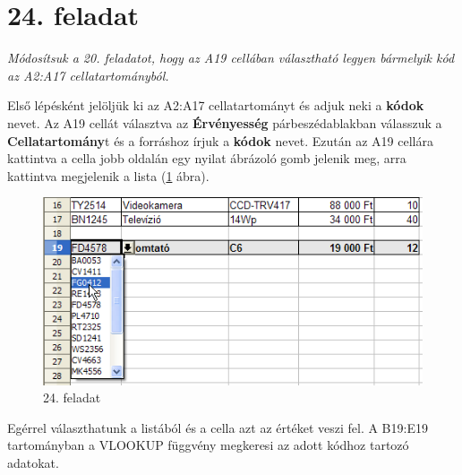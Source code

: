 \section{24. feladat}

{\itshape
Módosítsuk a 20. feladatot, hogy az A19 cellában választható
legyen bármelyik kód az A2:A17 cellatartományból.}

Első lépésként jelöljük ki az A2:A17 cellatartományt
és adjuk neki a \textbf{kódok} nevet. Az A19 cellát választva
az \textbf{Érvényesség} párbeszédablakban válasszuk a
\textbf{Cellatartomány}t és a forráshoz írjuk a
 \textbf{kódok} nevet. Ezután az A19 cellára kattintva a cella
jobb oldalán egy nyilat ábrázoló gomb jelenik meg, arra
kattintva megjelenik a lista (\ref{24-feladat} ábra).

\begin{figure}[!h]
\begin{center}
\includegraphics[width=12.751cm]{oocalcv1-img110.png}
\caption{24. feladat}\label{24-feladat}
\end{center}
\end{figure}

Egérrel választhatunk a listából és a cella azt az értéket
veszi fel. A B19:E19 tartományban a VLOOKUP függvény megkeresi az
adott kódhoz tartozó adatokat.

